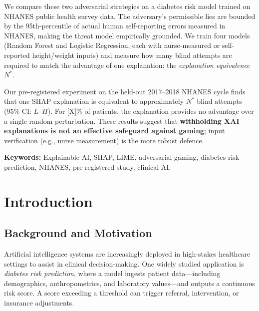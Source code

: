 \documentclass[12pt, a4paper, oneside]{report}
\theoremstyle{definition}
\begin{document}
We compare these two adversarial strategies on a diabetes risk model
trained on NHANES public health survey data. The adversary's permissible
lies are bounded by the 95th-percentile of actual human self-reporting
errors measured in NHANES, making the threat model empirically grounded.
We train four models (Random Forest and Logistic Regression, each with
nurse-measured or self-reported height/weight inputs) and measure how
many blind attempts are required to match the advantage of one explanation:
the \textit{explanation equivalence} $N^*$.

Our pre-registered experiment on the held-out 2017--2018 NHANES cycle
finds that one SHAP explanation is equivalent to approximately $N^*$
blind attempts (95\% CI: $L$--$H$). For [X]\% of patients, the
explanation provides no advantage over a single random perturbation.
These results suggest that \textbf{withholding XAI explanations is not
an effective safeguard against gaming}; input verification (e.g., nurse
measurement) is the more robust defence.

\textbf{Keywords:} Explainable AI, SHAP, LIME, adversarial gaming, diabetes
risk prediction, NHANES, pre-registered study, clinical AI.

\tableofcontents
\listoffigures
\listoftables

\chapter{Introduction}
\label{chap:intro}


\section{Background and Motivation}

Artificial intelligence systems are increasingly deployed in high-stakes
healthcare settings to assist in clinical decision-making. One widely
studied application is \textit{diabetes risk prediction}, where a model
ingests patient data---including demographics, anthropometrics, and
laboratory values---and outputs a continuous risk score. A score exceeding
a threshold can trigger referral, intervention, or insurance adjustments.
\end{document}
